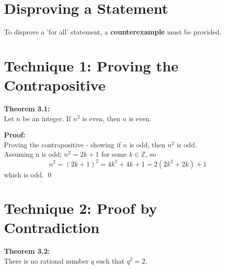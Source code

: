 \documentclass{report}
\newenvironment{frameblack}[1][Black]
  {\begin{tcolorbox}[colframe=#1,colback=white]}
  {\end{tcolorbox}}
\newenvironment{framered}[1][Maroon]
  {\begin{tcolorbox}[colframe=#1,colback=white]}
  {\end{tcolorbox}}
\begin{document}
\section{Disproving a Statement}

To disprove a 'for all' statement, a \textbf{counterexample} must be provided.

\section{Technique 1: Proving the Contrapositive}

\begin{framered}
    \textbf{Theorem 3.1:}\\
    Let $n$ be an integer. If $n^2$ is even, then $n$ is even.
\end{framered}

\begin{frameblack}
    \textbf{Proof:}\\
    Proving the contrapositive - showing if $n$ is odd, then $n^2$ is odd.\\
    Assuming n is odd; $n^2 = 2k + 1$ for some $k \in \mathbb{Z}$, so\\
    \begin{equation*}
        n^2 = (2k+1)^2 = 4k^2 + 4k + 1 = 2(2k^2 +2k) +1
    \end{equation*}
    which is odd.
    \qed
\end{frameblack}
\pagebreak

\section{Technique 2: Proof by Contradiction}

\begin{framered}
    \textbf{Theorem 3.2:}\\
    There is no rational number $q$ such that $q^2 = 2$.
\end{framered}
\end{document}
